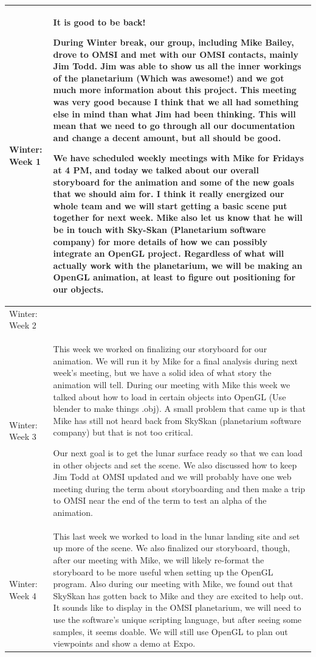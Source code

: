 \documentclass[onecolumn, draftclsnofoot,10pt, compsoc]{IEEEtran}
\begin{document}
\begin{longtable} {|p{1.5cm}|p{13.5cm}|}
Winter: Week 1 &
It is good to be back!

During Winter break, our group, including Mike Bailey, drove to OMSI and met with our OMSI contacts, mainly Jim Todd. Jim was able to show us all the inner workings of the planetarium (Which was awesome!) and we got much more information about this project. This meeting was very good because I think that we all had something else in mind than what Jim had been thinking. This will mean that we need to go through all our documentation and change a decent amount, but all should be good.

We have scheduled weekly meetings with Mike for Fridays at 4 PM, and today we talked about our overall storyboard for the animation and some of the new goals that we should aim for. I think it really energized our whole team and we will start getting a basic scene put together for next week. Mike also let us know that he will be in touch with Sky-Skan (Planetarium software company) for more details of how we can possibly integrate an OpenGL project. Regardless of what will actually work with the planetarium, we will be making an OpenGL animation, at least to figure out positioning for our objects. \\ \hline

Winter: Week 2 & 
\\ \hline

Winter: Week 3 &
This week we worked on finalizing our storyboard for our animation. We will run it by Mike for a final analysis during next week's meeting, but we have a solid idea of what story the animation will tell. During our meeting with Mike this week we talked about how to load in certain objects into OpenGL (Use blender to make things .obj). A small problem that came up is that Mike has still not heard back from SkySkan (planetarium software company) but that is not too critical. 

Our next goal is to get the lunar surface ready so that we can load in other objects and set the scene. We also discussed how to keep Jim Todd at OMSI updated and we will probably have one web meeting during the term about storyboarding and then make a trip to OMSI near the end of the term to test an alpha of the animation. 
 \\ \hline

Winter: Week 4 &This last week we worked to load in the lunar landing site and set up more of the scene. We also finalized our storyboard, though, after our meeting with Mike, we will likely re-format the storyboard to be more useful when setting up the OpenGL program. Also during our meeting with Mike, we found out that SkySkan has gotten back to Mike and they are excited to help out. It sounds like to display in the OMSI planetarium, we will need to use the software's unique scripting language, but after seeing some samples, it seems doable. We will still use OpenGL to plan out viewpoints and show a demo at Expo. 


\end{longtable}
\end{document}
